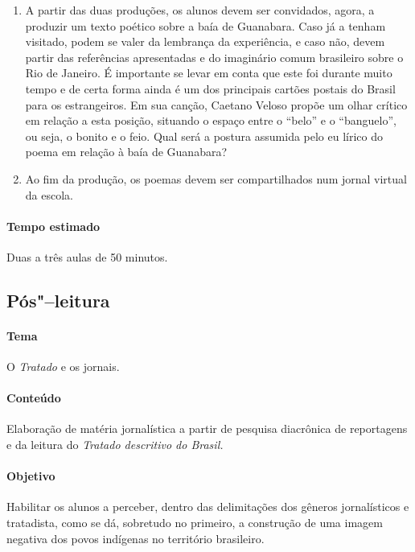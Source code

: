 \documentclass[12pt]{extarticle}
\begin{document}
\begin{enumerate}
\item 
A partir das duas produções, os alunos devem ser convidados, agora, a 
produzir um texto poético sobre a baía de Guanabara. Caso já a tenham 
visitado, podem se valer da lembrança da experiência, e caso não, devem 
partir das referências apresentadas e do imaginário comum brasileiro 
sobre o Rio de Janeiro. É importante se levar em conta que este foi 
durante muito tempo e de certa forma ainda é um dos principais cartões 
postais do Brasil para os estrangeiros. Em sua canção, Caetano Veloso 
propõe um olhar crítico em relação a esta posição, situando o espaço 
entre o ``belo'' e o ``banguelo'', ou seja, o bonito e o feio. Qual será 
a postura assumida pelo eu lírico do poema em relação à baía de Guanabara? 

\item 
Ao fim da produção, os poemas devem ser compartilhados num jornal virtual 
da escola.

\end{enumerate}
\paragraph{Tempo estimado} Duas a três aulas de 50 minutos.

\subsection{Pós"--leitura}

\paragraph{Tema} O \emph{Tratado} e os jornais.  

\paragraph{Conteúdo} Elaboração de matéria jornalística a partir
de pesquisa diacrônica de reportagens e da leitura do \emph{Tratado descritivo do Brasil.}

\paragraph{Objetivo} Habilitar os alunos a perceber, dentro das 
delimitações dos gêneros jornalísticos e tratadista, como se dá,
sobretudo no primeiro, a construção de uma imagem negativa dos povos 
indígenas no território brasileiro.
\end{document}
